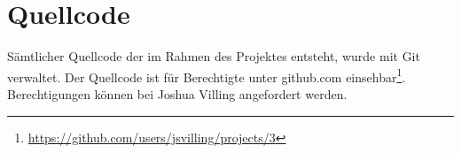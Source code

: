 \section{Quellcode}\label{sec:quellcode}

Sämtlicher Quellcode der im Rahmen des Projektes entsteht, wurde mit Git verwaltet. Der Quellcode ist für Berechtigte unter github.com einsehbar\footnote{\url{https://github.com/users/jsvilling/projects/3}}.
Berechtigungen können bei Joshua Villing angefordert werden.

\clearpage
